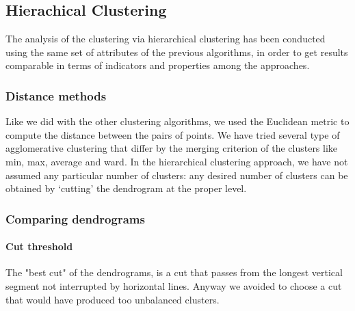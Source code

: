 \subsection{Hierachical Clustering}
The analysis of the clustering via hierarchical clustering has been conducted using the same set of attributes of the previous algorithms, in order to get results comparable in terms of indicators and properties among the approaches.

\subsubsection{Distance methods}
Like we did with the other clustering algorithms, we used the Euclidean metric to compute the distance between the pairs of points. We have tried several type of agglomerative clustering that differ by the merging criterion of the clusters like min, max, average and ward. In the hierarchical clustering approach, we have not assumed any particular number of clusters: any desired number of clusters can be obtained by ‘cutting’ the dendrogram at the proper level.

\subsubsection{Comparing dendrograms}
\paragraph{Cut threshold} The "best cut" of the dendrograms, is a cut that passes from the longest vertical segment not interrupted by horizontal lines. Anyway we avoided to choose a cut that would have produced too unbalanced clusters.

